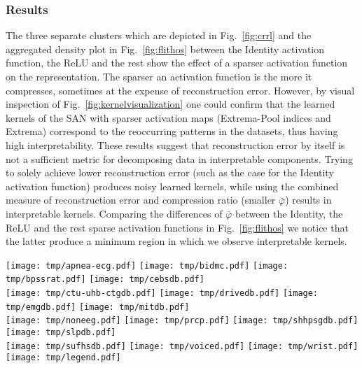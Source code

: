 \documentclass[journal]{IEEEtran}
\begin{document}
\subsubsection{Results}
The three separate clusters which are depicted in Fig.~\ref{fig:crrl} and the aggregated density plot in Fig.~\ref{fig:flithos} between the Identity activation function, the ReLU and the rest show the effect of a sparser activation function on the representation.
The sparser an activation function is the more it compresses, sometimes at the expense of reconstruction error.
However, by visual inspection of Fig.~\ref{fig:kernelvisualization} one could confirm that the learned kernels of the SAN with sparser activation maps (Extrema-Pool indices and Extrema) correspond to the reoccurring patterns in the datasets, thus having high interpretability.
These results suggest that reconstruction error by itself is not a sufficient metric for decomposing data in interpretable components.
Trying to solely achieve lower reconstruction error (such as the case for the Identity activation function) produces noisy learned kernels, while using the combined measure of reconstruction error and compression ratio (smaller $\bar\varphi$) results in interpretable kernels.
Comparing the differences of $\bar\varphi$ between the Identity, the ReLU and the rest sparse activation functions in Fig.~\ref{fig:flithos} we notice that the latter produce a minimum region in which we observe interpretable kernels.

\begin{figure*}[!t]
	\texttt{[image: tmp/apnea-ecg.pdf]}
	\texttt{[image: tmp/bidmc.pdf]}
	\texttt{[image: tmp/bpssrat.pdf]}
	\texttt{[image: tmp/cebsdb.pdf]}
	\\
	\texttt{[image: tmp/ctu-uhb-ctgdb.pdf]}
	\texttt{[image: tmp/drivedb.pdf]}
	\texttt{[image: tmp/emgdb.pdf]}
	\texttt{[image: tmp/mitdb.pdf]}
	\\
	\texttt{[image: tmp/noneeg.pdf]}
	\texttt{[image: tmp/prcp.pdf]}
	\texttt{[image: tmp/shhpsgdb.pdf]}
	\texttt{[image: tmp/slpdb.pdf]}
	\\
	\texttt{[image: tmp/sufhsdb.pdf]}
	\texttt{[image: tmp/voiced.pdf]}
	\texttt{[image: tmp/wrist.pdf]}
	\texttt{[image: tmp/legend.pdf]}
	\caption{Inverse compression ratio ($CR^{-1}$) vs.\ normalized reconstruction loss ($\tilde{\mathcal{L}}$) for the $15$ datasets of Physionet for various kernel sizes.
	The five inner plots with the yellow background on the right of each subplot, depict the corresponding kernel for the kernel size that achieved the best $\bar\varphi$.}\label{fig:crrl}
\end{figure*}
\end{document}
